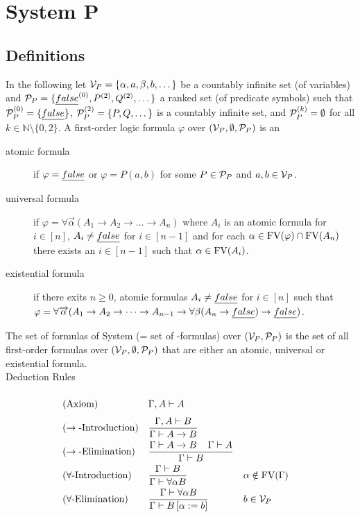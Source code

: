 \section{System P}
\subsection{Definitions}
In the following let $\mathcal{V}_P=\{\alpha,a,\beta,b,\dots\}$ be a countably infinite set (of variables) and $\mathcal{P}_P=\{\emph{false}^{(0)},P^{(2)},Q^{(2)},\dots\}$ a ranked set (of predicate symbols) such that $\mathcal{P}_P^{(0)}=\{\emph{false}\}$, $\mathcal{P}_P^{(2)}=\{P,Q,\dots\}$ is a countably infinite set, and $\mathcal{P}_P^{(k)}=\emptyset$ for all $k\in\mathbb{N}\setminus\{0,2\}$.
A first-order logic formula $\varphi$ over $(\mathcal{V}_P,\emptyset,\mathcal{P}_P)$ is an 
\begin{description} %
	\item[atomic formula] if $\varphi=\emph{false}$ or $\varphi=P(a,b)$ for some $P\in\mathcal{P}_P$ and $a,b\in\mathcal{V}_P$.
	\item[universal formula] if $\varphi=\forall\overrightarrow{\alpha}(A_1\to A_2 \to\dots\to A_n)$ where $A_i$ is an atomic formula for $i\in\left[n\right]$, $A_i\neq\emph{false}$ for $i\in\left[n-1\right]$ and for each $\alpha\in\text{FV}(\varphi)\cap\text{FV}(A_n)$ there exists an $i\in\left[n-1\right]$ such that $\alpha\in\text{FV}(A_i)$.
	\item[existential formula] if there exits $n\ge0$,  atomic formulas $A_i\neq\emph{false}$ for $i\in\left[n\right]$ such that $\varphi=\forall\overrightarrow{\alpha}(A_1\to A_2 \to\dots\to A_{n-1}\to\forall\beta(A_n\to\emph{false})\to\emph{false})$.
\end{description}
The set of formulas of System \SysP{} (= set of \SysP-formulas) over $(\mathcal{V}_P,\mathcal{P}_P)$ is the set of all first-order formulas over $(\mathcal{V}_P,\emptyset,\mathcal{P}_P)$ that are either an atomic, universal or existential formula.\\ 
Deduction Rules
\begin{mdframed}
	\begingroup%
	\addtolength{\jot}{0.3cm}
	\begin{align*}
		&(\text{Axiom}) &&\Gamma,A\vdash A\vphantom{\frac{\Gamma}{\Gamma}}\\
		&(\rightarrow\text{-Introduction}) &&\frac{\Gamma,A\vdash B}{\Gamma\vdash A\to B}\\
		&(\rightarrow\text{-Elimination}) &&\frac{\Gamma\vdash A\to B \hspace{0.4cm}\Gamma\vdash A}{\Gamma\vdash B}\\
		  & (\forall\text{-Introduction}) &   & \frac{\Gamma\vdash B}{\Gamma\vdash \forall\alpha B} &   & \alpha\notin\FV(\Gamma) \\
		&(\forall\text{-Elimination}) &&\frac{\Gamma\vdash \forall\alpha B }{\Gamma\vdash B\left[ \alpha:=b\right] }
		&& b\in\VarP %
	\end{align*}
	\endgroup
\end{mdframed}
